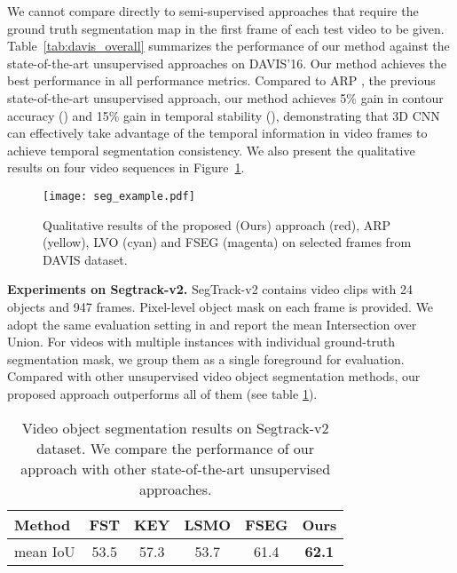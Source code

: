 \documentclass{bmvc2k}
\begin{document}
We cannot compare directly to semi-supervised approaches that require the ground truth segmentation map in the first frame of each test video to be given. Table~\ref{tab:davis_overall} summarizes the performance of our method against the state-of-the-art unsupervised approaches on DAVIS'16. Our method achieves the best performance in all performance metrics. Compared to ARP \cite{koh2017primary}, the previous state-of-the-art unsupervised approach, our method achieves 5\% gain in contour accuracy () and 15\% gain in temporal stability (), demonstrating that 3D CNN can effectively take advantage of the temporal information in video frames to achieve temporal segmentation consistency. We also present the qualitative results on four video sequences in Figure~\ref{fig:mtcnn_example}.


\begin{figure}[!htbp]
\centering
\texttt{[image: seg\_example.pdf]}
\caption{Qualitative results of the proposed (Ours) approach (red), ARP (yellow), LVO (cyan) and FSEG (magenta) on selected frames from DAVIS dataset.}
\label{fig:mtcnn_example}
\end{figure}

\textbf{Experiments on Segtrack-v2.} SegTrack-v2 \cite{li2013video} contains  video clips with 24 objects and 947 frames. Pixel-level object mask on each frame is provided. We adopt the same evaluation setting in \cite{khoreva2016learning} and report the mean Intersection over Union. For videos with multiple instances with individual ground-truth segmentation mask, we group them as a single foreground for evaluation. Compared with other unsupervised video object segmentation methods, our proposed approach outperforms all of them (see table \ref {tab:segtrack}).
\begin{table}[]
\centering
\small
\begin{tabular}{l|ccccc}
\hline
Method      & FST \cite{papazoglou2013fast}  & KEY \cite{lee2011key}  & LSMO \cite{tokmakov2017learning} & FSEG \cite{jain2017fusionseg} & Ours \\
\hline
mean IoU    & 53.5  & 57.3  & 53.7  & 61.4  & {\bf 62.1} \\   
\hline
\end{tabular}
\caption{Video object segmentation results on Segtrack-v2 dataset. We compare the performance of our approach with other state-of-the-art unsupervised approaches.}
\label{tab:segtrack}
\end{table}
\end{document}
